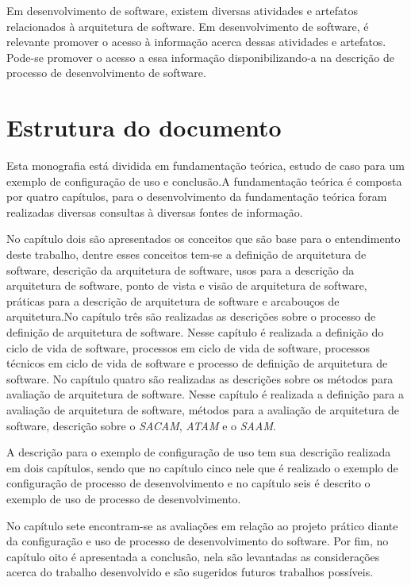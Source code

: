 Em desenvolvimento de software, existem diversas atividades e artefatos relacionados à arquitetura de software. Em desenvolvimento de software, é relevante promover o acesso à informação acerca dessas atividades e artefatos. Pode-se promover o acesso a essa informação disponibilizando-a na descrição de processo de desenvolvimento de software.

\section{Estrutura do documento}

Esta monografia está dividida em fundamentação teórica, estudo de caso para um exemplo de configuração de uso e conclusão.A fundamentação teórica é composta por quatro capítulos, para o desenvolvimento da fundamentação teórica foram realizadas diversas consultas à diversas fontes de informação.

No capítulo dois são apresentados os conceitos que são base para o entendimento deste trabalho, dentre esses conceitos tem-se a definição de arquitetura de software, descrição da arquitetura de software, usos para a descrição da arquitetura de software, ponto de vista e visão de arquitetura de software, práticas para a descrição de arquitetura de software e arcabouços de arquitetura.No capítulo três são realizadas as descrições sobre o processo de definição de arquitetura de software. Nesse capítulo é realizada a definição do ciclo de vida de software, processos em ciclo de vida de software, processos técnicos em ciclo de vida de software e processo de definição de arquitetura de software.
No capítulo quatro são realizadas as descrições sobre os métodos para avaliação de arquitetura de software. Nesse capítulo é realizada a definição para a avaliação de arquitetura de software, métodos para a avaliação de arquitetura de software, descrição sobre o \emph{\acrfull{SACAM}}, \emph{\acrfull{ATAM}} e o \emph{\acrfull{SAAM}}. 

A descrição  para o exemplo de configuração de uso tem sua descrição realizada em dois capítulos, sendo que no capítulo cinco nele que é realizado o exemplo de configuração de processo de desenvolvimento e no capítulo seis é descrito o exemplo de uso de processo de desenvolvimento.

No capítulo sete encontram-se as avaliações em relação ao projeto prático diante da configuração e uso de processo de desenvolvimento do software. Por fim, no capítulo oito é apresentada a conclusão, nela são levantadas as considerações acerca do trabalho desenvolvido e são sugeridos futuros trabalhos possíveis.